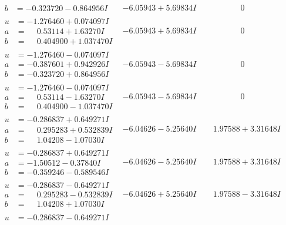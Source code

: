\documentclass[1p]{elsarticle_modified}
\theoremstyle{definition}
\begin{document}
$$\begin{array}{c|c|c}
\begin{aligned}
b &= -0.323720 - 0.864956 I\end{aligned}
 & -6.05943 + 5.69834 I & \phantom{-0.000000 } 0 \\ \hline\begin{aligned}
u &= -1.276460 + 0.074097 I \\
a &= \phantom{-}0.53114 + 1.63270 I \\
b &= \phantom{-}0.404900 + 1.037470 I\end{aligned}
 & -6.05943 + 5.69834 I & \phantom{-0.000000 } 0 \\ \hline\begin{aligned}
u &= -1.276460 - 0.074097 I \\
a &= -0.387601 + 0.942926 I \\
b &= -0.323720 + 0.864956 I\end{aligned}
 & -6.05943 - 5.69834 I & \phantom{-0.000000 } 0 \\ \hline\begin{aligned}
u &= -1.276460 - 0.074097 I \\
a &= \phantom{-}0.53114 - 1.63270 I \\
b &= \phantom{-}0.404900 - 1.037470 I\end{aligned}
 & -6.05943 - 5.69834 I & \phantom{-0.000000 } 0 \\ \hline\begin{aligned}
u &= -0.286837 + 0.649271 I \\
a &= \phantom{-}0.295283 + 0.532839 I \\
b &= \phantom{-}1.04208 - 1.07030 I\end{aligned}
 & -6.04626 - 5.25640 I & \phantom{-}1.97588 + 3.31648 I \\ \hline\begin{aligned}
u &= -0.286837 + 0.649271 I \\
a &= -1.50512 - 0.37840 I \\
b &= -0.359246 - 0.589546 I\end{aligned}
 & -6.04626 - 5.25640 I & \phantom{-}1.97588 + 3.31648 I \\ \hline\begin{aligned}
u &= -0.286837 - 0.649271 I \\
a &= \phantom{-}0.295283 - 0.532839 I \\
b &= \phantom{-}1.04208 + 1.07030 I\end{aligned}
 & -6.04626 + 5.25640 I & \phantom{-}1.97588 - 3.31648 I \\ \hline\begin{aligned}
u &= -0.286837 - 0.649271 I \\

\end{aligned}
\end{array}$$
\end{document}
